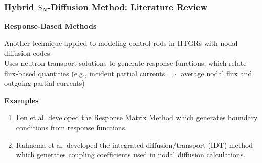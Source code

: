 \begin{frame}
  \frametitle{Hybrid $S_N$-Diffusion Method: Literature Review}
  \textbf{Response-Based Methods}
  \vspace{.3cm}

  Another technique applied to modeling control rods in HTGRs with nodal diffusion codes. \\
  Uses neutron transport solutions to generate response functions, which relate flux-based
  quantities (e.g., incident partial currents $\Rightarrow$ average nodal flux and outgoing partial
  currents)
  \vspace{.3cm}

  \textbf{Examples}
  \begin{enumerate}
    \item Fen et al. \cite{fen_modelling_1992} developed the Response Matrix Method which generates
      boundary conditions from response functions.
    \item Rahnema et al. \cite{rahnema_advanced_2011} developed the integrated diffusion/transport
      (IDT) method which generates coupling coefficients used in nodal diffusion calculations.
  \end{enumerate}
\end{frame}

